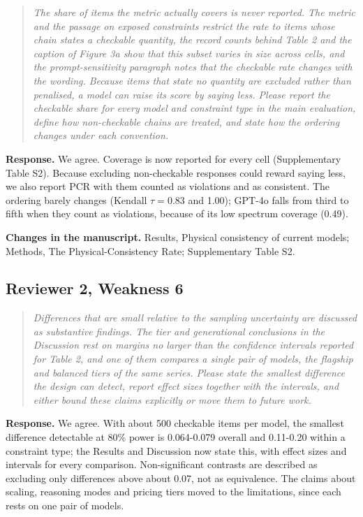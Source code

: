 \documentclass[11pt,a4paper]{article}
\newenvironment{reviewer}{\begin{quote}\itshape\small}{\end{quote}}
\begin{document}
\begin{reviewer}The share of items the metric actually covers is never reported. The metric and the passage on exposed constraints restrict the rate to items whose chain states a checkable quantity, the record counts behind Table 2 and the caption of Figure 3a show that this subset varies in size across cells, and the prompt-sensitivity paragraph notes that the checkable rate changes with the wording. Because items that state no quantity are excluded rather than penalised, a model can raise its score by saying less. Please report the checkable share for every model and constraint type in the main evaluation, define how non-checkable chains are treated, and state how the ordering changes under each convention.\end{reviewer}

\textbf{Response.} We agree. Coverage is now reported for every cell (Supplementary Table S2). Because excluding non-checkable responses could reward saying less, we also report PCR with them counted as violations and as consistent. The ordering barely changes (Kendall $\tau=0.83$ and 1.00); GPT-4o falls from third to fifth when they count as violations, because of its low spectrum coverage (0.49).

\textbf{Changes in the manuscript.} Results, Physical consistency of current models; Methods, The Physical-Consistency Rate; Supplementary Table S2.

\subsection*{Reviewer 2, Weakness 6}

\begin{reviewer}Differences that are small relative to the sampling uncertainty are discussed as substantive findings. The tier and generational conclusions in the Discussion rest on margins no larger than the confidence intervals reported for Table 2, and one of them compares a single pair of models, the flagship and balanced tiers of the same series. Please state the smallest difference the design can detect, report effect sizes together with the intervals, and either bound these claims explicitly or move them to future work.\end{reviewer}

\textbf{Response.} We agree. With about 500 checkable items per model, the smallest difference detectable at 80\% power is 0.064-0.079 overall and 0.11-0.20 within a constraint type; the Results and Discussion now state this, with effect sizes and intervals for every comparison. Non-significant contrasts are described as excluding only differences above about 0.07, not as equivalence. The claims about scaling, reasoning modes and pricing tiers moved to the limitations, since each rests on one pair of models.
\end{document}
